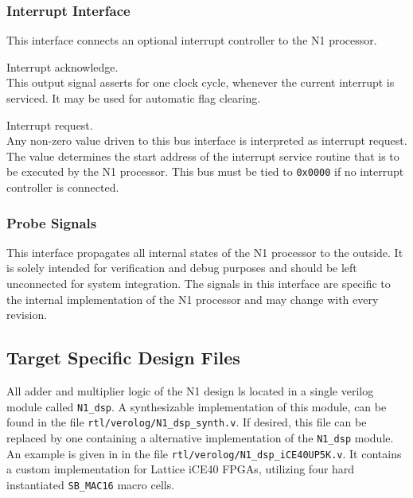 \subsubsection{Interrupt Interface}
\label{integration:if:irq}
This interface connects an optional interrupt controller to the N1 processor. 


\begin{description}[style=nextline]

\item[\texttt{irq\_ack\_o}] Interrupt acknowledge. \\
  This output signal asserts for one clock cycle, whenever the current interrupt is serviced.
  It may be used for automatic flag clearing.

\item[\texttt{irq\_req\_i}] Interrupt request. \\
  Any non-zero value driven to this bus interface is interpreted as interrupt request.
  The value determines the start address of the interrupt service routine that is to be executed by the
  N1 processor. This bus must be tied to \texttt{0x0000} if no interrupt controller is connected.
  
\end{description}

\subsubsection{Probe Signals}
\label{integration:if:prb}
This interface propagates all internal states of the N1 processor to the outside.
It is solely intended for verification and debug purposes and should be left unconnected for system integration.
The signals in this interface are specific to the internal implementation of the N1 processor and may change
with every revision.

\subsection{Target Specific Design Files}
\label{integration:ifs}
All adder and multiplier logic of the N1 design ls located in a single \gls{verilog} module called \texttt{N1\_dsp}.
A synthesizable implementation of this module, can be found in the file \texttt{rtl/verolog/N1\_dsp\_synth.v}.
If desired, this file can be replaced by one containing a alternative implementation of the \texttt{N1\_dsp} module.
An example is given in in the file \texttt{rtl/verolog/N1\_dsp\_iCE40UP5K.v}.
It contains a custom implementation for Lattice iCE40 FPGAs, utilizing four hard instantiated \texttt{SB\_MAC16}
macro cells.

